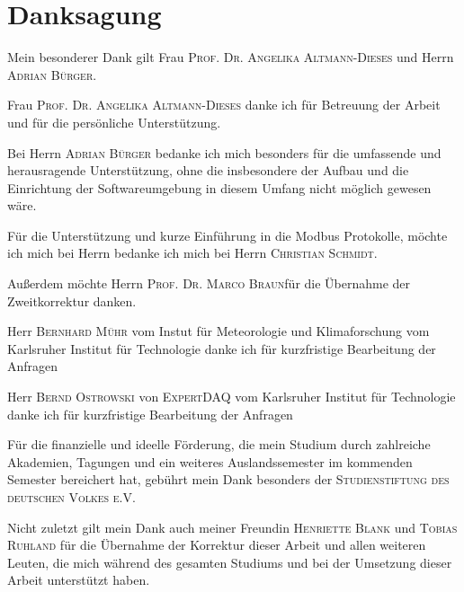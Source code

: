 %
%
%
\chapter*{Danksagung}
\thispagestyle{empty}

\noindent Mein besonderer Dank gilt Frau \textsc{Prof. Dr. Angelika Altmann-Dieses} und Herrn \textsc{Adrian Bürger}.

\noindent Frau \textsc{Prof. Dr. Angelika Altmann-Dieses} danke ich für Betreuung der Arbeit und für die persönliche Unterstützung.

\noindent Bei Herrn \textsc{Adrian Bürger} bedanke ich mich besonders für die umfassende und herausragende Unterstützung, ohne die insbesondere der Aufbau und die Einrichtung der Softwareumgebung in diesem Umfang nicht möglich gewesen wäre.

\noindent Für die Unterstützung und kurze Einführung in die Modbus Protokolle, möchte ich mich bei Herrn bedanke ich mich bei Herrn \textsc{Christian Schmidt}.

\noindent Außerdem möchte Herrn \textsc{Prof. Dr. Marco Braun}für die Übernahme der Zweitkorrektur danken.

\noindent Herr \textsc{Bernhard Mühr} vom Instut für Meteorologie und Klimaforschung vom Karlsruher Institut für Technologie danke ich für kurzfristige Bearbeitung der Anfragen

\noindent Herr \textsc{Bernd Ostrowski} von \textsc{ExpertDAQ} vom Karlsruher Institut für Technologie danke ich für kurzfristige Bearbeitung der Anfragen

\noindent Für die finanzielle und ideelle Förderung, die mein Studium durch zahlreiche Akademien, Tagungen und ein weiteres Auslandssemester im kommenden Semester bereichert hat, gebührt mein Dank besonders der \textsc{Studienstiftung des deutschen Volkes e.V.}

\noindent Nicht zuletzt gilt mein Dank auch meiner Freundin \textsc{Henriette Blank} und \textsc{Tobias Ruhland} für die Übernahme der Korrektur dieser Arbeit und allen weiteren Leuten, die mich während des gesamten Studiums und bei der Umsetzung dieser Arbeit unterstützt haben.